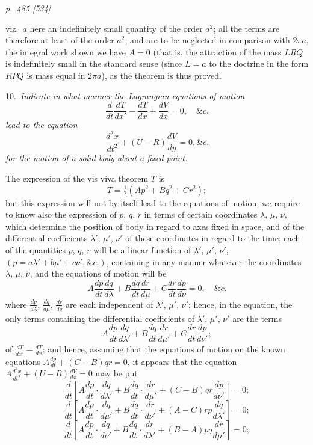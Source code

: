 \documentclass[11pt,a4paper]{book}
\begin{document}
\clearpage

\bigskip
\textit{p.~485 [534]}
\smallskip

\noindent
viz.\ $a$ here an indefinitely small quantity of the order $a^2$; all the terms are therefore
at least of the order $a^2$, and are to be neglected in comparison with $2\pi a$, the integral
work shown we have $A = 0$ (that is, the attraction of the mass $LRQ$ is indefinitely
small in the standard sense (since $L = a$ to the doctrine in the form $RPQ$ is
mass equal in $2\pi a$), as the theorem is thus proved.

\smallskip
\noindent\textsc{10.}\, \textit{Indicate in what manner the Lagrangian equations of motion}
\[
\frac{d}{dt}\frac{dT}{dx'} - \frac{dT}{dx} + \frac{dV}{dx} = 0, \quad \&c.
\]
\textit{lead to the equation}
\[
\frac{d^2x}{dt^2} + (U - R)\frac{dV}{dy} = 0, \&c.
\]
\textit{for the motion of a solid body about a fixed point.}

The expression of the vis viva theorem $T$ is
\[
T = \tfrac{1}{2}(Ap^2 + Bq^2 + Cr^2);
\]
but this expression will not by itself lead to the equations of motion; we require to
know also the expression of $p$, $q$, $r$ in terms of certain coordinates $\lambda$, $\mu$, $\nu$, which
determine the position of body in regard to axes fixed in space, and of the
differential coefficients $\lambda'$, $\mu'$, $\nu'$ of these coordinates in regard to the time; each of
the quantities $p$, $q$, $r$ will be a linear function of $\lambda'$, $\mu'$, $\nu'$, $(p = a\lambda' + b\mu' + c\nu', \&c.)$,
containing in any manner whatever the coordinates $\lambda$, $\mu$, $\nu$, and the equations of motion will be
\[
A\frac{dp}{dt}\frac{dq}{d\lambda} + B\frac{dq}{dt}\frac{dr}{d\mu} + C\frac{dr}{dt}\frac{dp}{d\nu} = 0, \quad \&c.
\]
where $\frac{dp}{d\lambda}$, $\frac{dq}{d\mu}$, $\frac{dr}{d\nu}$ are each independent of $\lambda'$, $\mu'$, $\nu'$; hence, in the equation, the
only terms containing the differential coefficients of $\lambda'$, $\mu'$, $\nu'$ are the terms
\[
A\frac{dp}{dt}\frac{dq}{d\lambda'} + B\frac{dq}{dt}\frac{dr}{d\mu'} + C\frac{dr}{dt}\frac{dp}{d\nu'};
\]
of $\frac{dT}{dx'} - \frac{dT}{dx}$; and hence, assuming that the equations of motion on the known equations
$A\frac{dp}{dt} + (C - B)qr = 0$, it appears that the equation $A\frac{d^2x}{dt^2} + (U - R)\frac{dV}{dx} = 0$ may be put
\[
\frac{d}{dt}\left[A\frac{dp}{dt}\cdot\frac{dq}{d\lambda'} + B\frac{dq}{dt}\cdot\frac{dr}{d\mu'} + (C - B)qr\frac{dp}{d\nu'}\right] = 0;
\]
\[
\frac{d}{dt}\left[A\frac{dp}{dt}\cdot\frac{dq}{d\mu'} + B\frac{dq}{dt}\cdot\frac{dr}{d\nu'} + (A - C)rp\frac{dq}{d\lambda'}\right] = 0;
\]
\[
\frac{d}{dt}\left[A\frac{dp}{dt}\cdot\frac{dq}{d\nu'} + B\frac{dq}{dt}\cdot\frac{dr}{d\lambda'} + (B - A)pq\frac{dr}{d\mu'}\right] = 0;
\]
\end{document}
